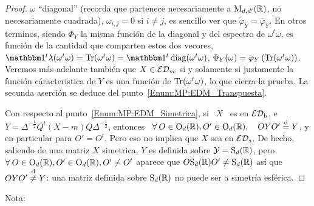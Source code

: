 \begin{proof}
  $\omega$    ``diagonal''    (recorda    que   partenece    necesariamente    a
  $\mathrm{M}_{d,d'}(\mathbb{R})$, \ie no necesariamente  cuadrada), \ie $\omega_{i,j} = 0$
  si   $i    \ne   j$,   es   sencillo   ver    que   $\widetilde{\varphi}_Y   =
  \overline{\varphi}_Y$. En  otros terminos, siendo $\Phi_Y$  la misma funci\'on
  de  la diagonal  y  del espectro  de  $\omega^t \omega$,  es  funci\'on de  la
  cantidad que comparten estos  dos vecores, \ie $\un^t \lambda(\omega^t \omega)
  = \Tr( \omega^t \omega) = \un^t \diag(\omega^t \omega)$, \ie $\Phi_Y(\omega) =
  \varphi_Y\left(  \operatorname{Tr}(\omega^t   \omega)  \right)$.   Veremos   m\'as  adelante
  tambi\'en  que $X \in  \mathcal{ED}_{\mathrm{vc}}$ si  y solamente  si justamente  la funci\'on
  c\'aracteristica de  $Y$ es una funci\'on  de $\operatorname{Tr}( \omega^t  \omega)$, lo que
  cierra   la  prueba.    \newline   La  secunda   aserci\'on   se  deduce   del
  punto~\ref{Enum:MP:EDM_Transpuesta}.

  Con  respecto   al  punto~\ref{Enum:MP:EDM_Simetrica},  si  \  $X$   \  es  en
  $\mathcal{ED}_{\mathrm{b}}$,  e  \  $Y  =  \Delta^{-\frac12} Q^t  (X-m)  Q  \Delta^{-\frac12}$,
  entonces \ $\forall \: O \in \mathrm{O}_d(\mathbb{R}), O' \in \mathrm{O}_d(\mathbb{R}), \quad O Y O'
  \stackrel{\mathrm{d}}{=} Y$, y en particular para $O' = O^t$. Pero eso no implica que $X$ sea en
  $\mathcal{ED}_{\mathrm{s}}$. De hecho, saliendo de  una matriz $X$ simetrica, $Y$ es definida
  sobre  $\mathcal{Y} =  \mathrm{S}_d(\mathbb{R})$, pero  $\forall \:  O \in  \mathrm{O}_d(\mathbb{R}),  O' \in
  \mathrm{O}_d(\mathbb{R}), O' \ne O^t$ aparece  que $O \mathrm{S}_d(\mathbb{R}) O' \ne \mathrm{S}_d(\mathbb{R})$
  as\'i que  $O Y O'  \stackrel{\mathrm{d}}{\neq} Y$: una  matriz definida sobre  $\mathrm{S}_d(\mathbb{R})$ no
  puede ser a simetr\'ia esf\'erica.
\end{proof}
%
Nota:
%
